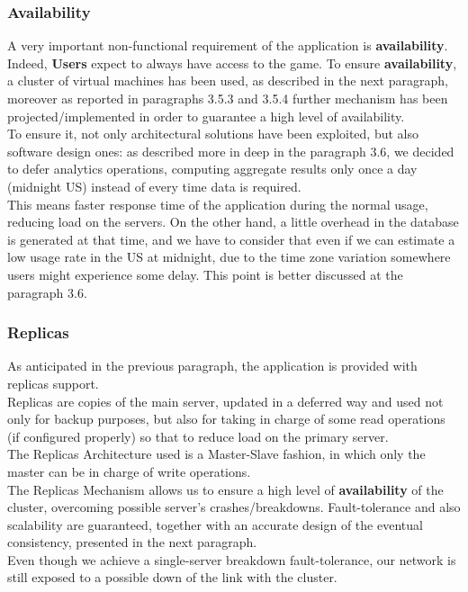 \subsubsection{Availability}
A very important non-functional requirement of the application is \textbf{availability}.\\ 
Indeed, \textbf{Users} expect to always have access to the game.
To ensure \textbf{availability}, a cluster of virtual machines has been used, as described in the next paragraph, moreover as reported in paragraphs 3.5.3 and 3.5.4 further mechanism has been projected/implemented in order to guarantee a high level of availability.\\
To ensure it, not only architectural solutions have been exploited, but also software design ones: as described more in deep in the paragraph 3.6, we decided to defer analytics operations, computing aggregate results only once a day (midnight US) instead of every time data is required.\\
This means faster response time of the application during the normal usage, reducing load on the servers. On the other hand, a little overhead in the database is generated at that time, and we have to consider that even if we can estimate a low usage rate in the US at midnight, due to the time zone variation somewhere users might experience some delay. This point is better discussed at the paragraph 3.6.     
\subsubsection{Replicas}
As anticipated in the previous paragraph, the application is provided with replicas support. \\
Replicas are copies of the main server, updated in a deferred way and used not only for backup purposes, but also for taking in charge of some read operations (if configured properly) so that to reduce load on the primary server. \\
The Replicas Architecture used is a Master-Slave fashion, in which only the master can be in charge of write operations.\\
The Replicas Mechanism allows us to ensure a high level of \textbf{availability} of the cluster, overcoming possible server’s crashes/breakdowns. Fault-tolerance and also scalability are guaranteed, together with an accurate design of the eventual consistency, presented in the next paragraph. \\
Even though we achieve a single-server breakdown fault-tolerance, our network is still exposed to a possible down of the link with the cluster.

